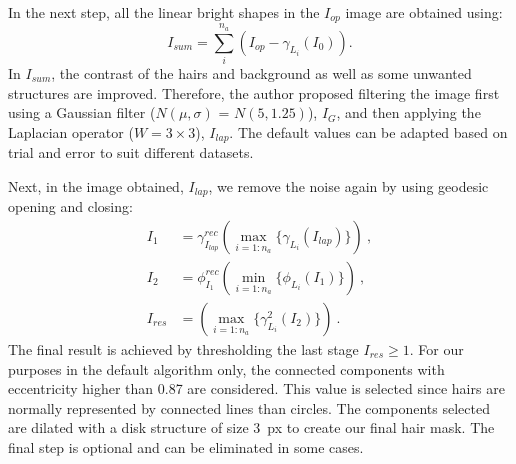 In the next step, all the linear bright shapes in the $I_{op}$ image are obtained using: 
\begin{equation}
I_{sum} = \sum\limits_{i}^{n_{a}}(I_{op} - \gamma_{L_{i}}(I_{0})).
\end{equation}
In $I_{sum}$, the contrast of the hairs and background as well as some unwanted structures are improved.
Therefore, the author proposed filtering the image first using a Gaussian filter ($N(\mu,\sigma)$ = $N(5,1.25)$), $I_{G}$, and then applying the Laplacian operator ($W = 3 \times 3$), $I_{lap}$.
The default values can be adapted based on trial and error to suit different datasets.


Next, in the image obtained, $I_{lap}$, we remove the noise again by using geodesic opening and closing:
\begin{subequations}
\begin{align}
I_{1} & = \gamma_{I_{lap}}^{rec} (\max\limits_{i = 1:n_{a}}\{\gamma_{L_{i}}(I_{lap})\})~,\\
I_{2} & = \phi_{I_{1}}^{rec}(\min\limits_{i = 1:n_{a}}\{\phi_{L_{i}}(I_{1})\})~, \\
I_{res} & = (\max\limits_{i =1 : n_{a}}\{\gamma_{L_{i}}^{2}(I_{2})\})~.
\end{align}
\end{subequations}
The final result is achieved by thresholding the last stage $I_{res} \geq 1$.
For our purposes in the default algorithm only, the connected components with eccentricity higher than 0.87 are considered.
This value is selected since hairs are normally represented by connected lines than circles.
The components selected are dilated with a disk structure of size 3~\si{px} to create our final hair mask.
The final step is optional and can be eliminated in some cases.

